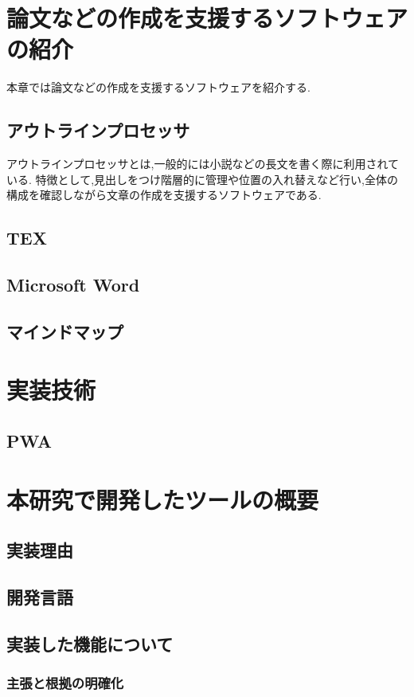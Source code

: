 \documentclass[a4j,12pt]{jarticle}
\begin{document}
\newpage
\section{論文などの作成を支援するソフトウェアの紹介}
本章では論文などの作成を支援するソフトウェアを紹介する.
\subsection{アウトラインプロセッサ}
アウトラインプロセッサとは,一般的には小説などの長文を書く際に利用されている.
特徴として,見出しをつけ階層的に管理や位置の入れ替えなど行い,全体の構成を確認しながら文章の作成を支援するソフトウェアである.
\subsection{TEX}

\subsection{Microsoft Word}

\subsection{マインドマップ}

\newpage
\section{実装技術}
\subsection{PWA}
\newpage
\section{本研究で開発したツールの概要}
\subsection{実装理由}
\subsection{開発言語}
\subsection{実装した機能について}
\subsubsection{主張と根拠の明確化}
\end{document}
